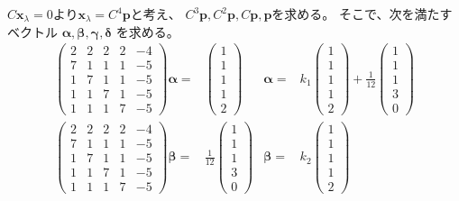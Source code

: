 \documentclass[12pt,b5paper]{ltjsarticle}
\begin{document}
\begin{enumerate}
      $C\bm{x}_\lambda =0$より$\bm{x}_\lambda = C^4\bm{p}$と考え、
      $C^3\bm{p},C^2\bm{p},C\bm{p},\bm{p}$を求める。
      そこで、次を満たすベクトル
      $\bm{\alpha},\bm{\beta},\bm{\gamma},\bm{\delta}$
      を求める。
      \begin{align}
       \begin{pmatrix}
        2 & 2 & 2 & 2 & -4\\
        7 & 1 & 1 & 1 & -5\\
        1 & 7 & 1 & 1 & -5\\
        1 & 1 & 7 & 1 & -5\\
        1 & 1 & 1 & 7 & -5
       \end{pmatrix}
       \bm{\alpha}=&\begin{pmatrix}1\\1\\1\\1\\2\end{pmatrix}
       &
       \bm{\alpha}=&k_1\begin{pmatrix}1\\1\\1\\1\\2\end{pmatrix}
       +\frac{1}{12}\begin{pmatrix}1\\1\\1\\3\\0\end{pmatrix}\\
       \begin{pmatrix}
        2 & 2 & 2 & 2 & -4\\
        7 & 1 & 1 & 1 & -5\\
        1 & 7 & 1 & 1 & -5\\
        1 & 1 & 7 & 1 & -5\\
        1 & 1 & 1 & 7 & -5
       \end{pmatrix}
       \bm{\beta}=&\frac{1}{12}\begin{pmatrix}1\\1\\1\\3\\0\end{pmatrix}
       &
       \bm{\beta}=&k_2\begin{pmatrix}1\\1\\1\\1\\2\end{pmatrix}

\end{align}
\end{enumerate}
\end{document}
